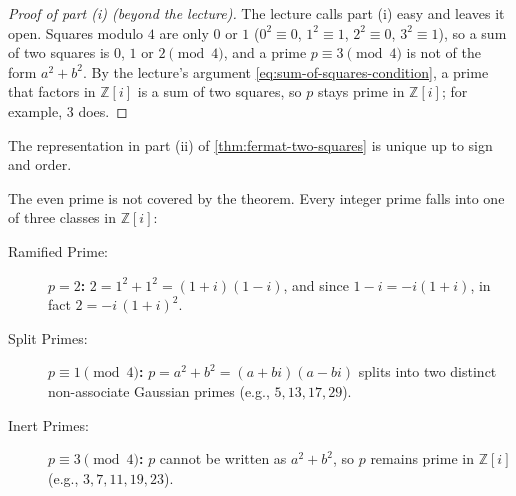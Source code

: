 \begin{content}


\begin{proof}[Proof of part (i) (beyond the lecture)]
The lecture calls part (i) easy and leaves it open. Squares modulo $4$ are only $0$ or $1$ ($0^2 \equiv 0$, $1^2 \equiv 1$, $2^2 \equiv 0$, $3^2 \equiv 1$), so a sum of two squares is $0$, $1$ or $2 \pmod 4$, and a prime $p \equiv 3 \pmod 4$ is not of the form $a^2 + b^2$. By the lecture's argument \eqref{eq:sum-of-squares-condition}, a prime that factors in $\mathbb{Z}[i]$ is a sum of two squares, so $p$ stays prime in $\mathbb{Z}[i]$; for example, $3$ does.
\end{proof}
\end{content}

\begin{aiNote}
The representation in part (ii) of \cref{thm:fermat-two-squares} is unique up to sign and order.

The even prime is not covered by the theorem. Every integer prime falls into one of three classes in $\mathbb{Z}[i]$:
\begin{description}
    \item[Ramified Prime:] \textbf{$p = 2$:} $2 = 1^2 + 1^2 = (1 + i)(1 - i)$, and since $1 - i = -i(1 + i)$, in fact $2 = -i \, (1 + i)^2$.
    \item[Split Primes:] \textbf{$p \equiv 1 \pmod 4$:} $p = a^2 + b^2 = (a + bi)(a - bi)$ splits into two distinct non-associate Gaussian primes (e.g., $5, 13, 17, 29$).
    \item[Inert Primes:] \textbf{$p \equiv 3 \pmod 4$:} $p$ cannot be written as $a^2 + b^2$, so $p$ remains prime in $\mathbb{Z}[i]$ (e.g., $3, 7, 11, 19, 23$).
\end{description}
\end{aiNote}

